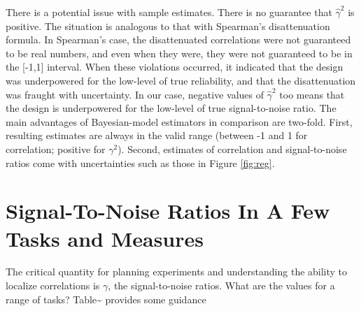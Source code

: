 \documentclass[
  ,man]{apa6}
\begin{document}
There is a potential issue with sample estimates. There is no guarantee that \(\hat{\gamma}^2\) is positive. The situation is analogous to that with Spearman's disattenuation formula. In Spearman's case, the disattenuated correlations were not guaranteed to be real numbers, and even when they were, they were not guaranteed to be in the {[}-1,1{]} interval. When these violations occurred, it indicated that the design was underpowered for the low-level of true reliability, and that the disattenuation was fraught with uncertainty. In our case, negative values of \(\hat{\gamma}^2\) too means that the design is underpowered for the low-level of true signal-to-noise ratio. The main advantages of Bayesian-model estimators in comparison are two-fold. First, resulting estimates are always in the valid range (between -1 and 1 for correlation; positive for \(\gamma^2\)). Second, estimates of correlation and signal-to-noise ratios come with uncertainties such as those in Figure \ref{fig:reg}.

\hypertarget{signal-to-noise-ratios-in-a-few-tasks-and-measures}{%
\section{Signal-To-Noise Ratios In A Few Tasks and Measures}\label{signal-to-noise-ratios-in-a-few-tasks-and-measures}}

The critical quantity for planning experiments and understanding the ability to localize correlations is \(\gamma\), the signal-to-noise ratios. What are the values for a range of tasks? Table\textasciitilde{} provides some guidance
\end{document}
